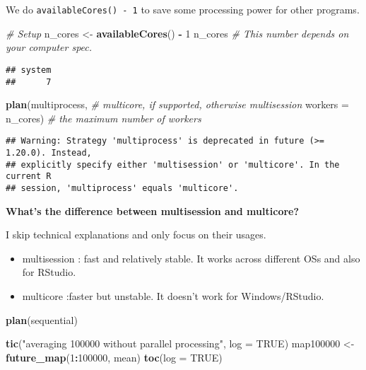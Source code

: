 \documentclass[
]{book}
\newenvironment{Shaded}{\begin{snugshade}}{\end{snugshade}}
\newcommand{\CommentTok}[1]{\textcolor[rgb]{0.56,0.35,0.01}{\textit{#1}}}
\newcommand{\DataTypeTok}[1]{\textcolor[rgb]{0.13,0.29,0.53}{#1}}
\newcommand{\DecValTok}[1]{\textcolor[rgb]{0.00,0.00,0.81}{#1}}
\newcommand{\KeywordTok}[1]{\textcolor[rgb]{0.13,0.29,0.53}{\textbf{#1}}}
\newcommand{\NormalTok}[1]{#1}
\newcommand{\OperatorTok}[1]{\textcolor[rgb]{0.81,0.36,0.00}{\textbf{#1}}}
\newcommand{\OtherTok}[1]{\textcolor[rgb]{0.56,0.35,0.01}{#1}}
\newcommand{\StringTok}[1]{\textcolor[rgb]{0.31,0.60,0.02}{#1}}
\providecommand{\tightlist}{%
  \setlength{\itemsep}{0pt}\setlength{\parskip}{0pt}}
\begin{document}
We do \texttt{availableCores()\ -\ 1} to save some processing power for other programs.

\begin{Shaded}
\begin{Highlighting}[]
\CommentTok{\# Setup }
\NormalTok{n\_cores \textless{}{-}}\StringTok{ }\KeywordTok{availableCores}\NormalTok{() }\OperatorTok{{-}}\StringTok{ }\DecValTok{1}
\NormalTok{n\_cores }\CommentTok{\# This number depends on your computer spec.}
\end{Highlighting}
\end{Shaded}

\begin{verbatim}
## system 
##      7
\end{verbatim}

\begin{Shaded}
\begin{Highlighting}[]
\KeywordTok{plan}\NormalTok{(multiprocess, }\CommentTok{\# multicore, if supported, otherwise multisession}
     \DataTypeTok{workers =}\NormalTok{ n\_cores) }\CommentTok{\# the maximum number of workers}
\end{Highlighting}
\end{Shaded}

\begin{verbatim}
## Warning: Strategy 'multiprocess' is deprecated in future (>= 1.20.0). Instead,
## explicitly specify either 'multisession' or 'multicore'. In the current R
## session, 'multiprocess' equals 'multicore'.
\end{verbatim}

\textbf{What's the difference between multisession and multicore?}

I skip technical explanations and only focus on their usages.

\begin{itemize}
\tightlist
\item
  multisession : fast and relatively stable. It works across different OSs and also for RStudio.
\item
  multicore :faster but unstable. It doesn't work for Windows/RStudio.
\end{itemize}

\begin{Shaded}
\begin{Highlighting}[]
\KeywordTok{plan}\NormalTok{(sequential)}

\KeywordTok{tic}\NormalTok{(}\StringTok{"averaging 100000 without parallel processing"}\NormalTok{, }\DataTypeTok{log =} \OtherTok{TRUE}\NormalTok{)}
\NormalTok{map100000 \textless{}{-}}\StringTok{ }\KeywordTok{future\_map}\NormalTok{(}\DecValTok{1}\OperatorTok{:}\DecValTok{100000}\NormalTok{, mean)}
\KeywordTok{toc}\NormalTok{(}\DataTypeTok{log =} \OtherTok{TRUE}\NormalTok{)}
\end{Highlighting}
\end{Shaded}
\end{document}
